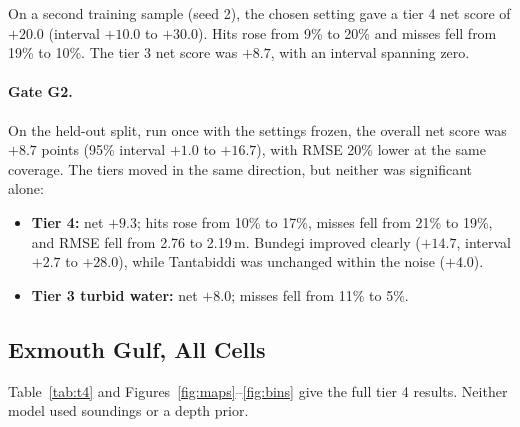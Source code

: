\documentclass[remotesensing,article,submit,pdftex]{Definitions/mdpi}
\begin{document}
On a second training sample (seed 2), the chosen setting gave a tier 4 net score of $+20.0$ (interval $+10.0$ to $+30.0$). Hits rose from 9\% to 20\% and misses fell from 19\% to 10\%. The tier 3 net score was $+8.7$, with an interval spanning zero.

\paragraph{Gate G2.} On the held-out split, run once with the settings frozen, the overall net score was $+8.7$ points (95\% interval $+1.0$ to $+16.7$), with RMSE 20\% lower at the same coverage. The tiers moved in the same direction, but neither was significant alone:
\begin{itemize}
\item \textbf{Tier 4:} net $+9.3$; hits rose from 10\% to 17\%, misses fell from 21\% to 19\%, and RMSE fell from 2.76 to 2.19\,m. Bundegi improved clearly ($+14.7$, interval $+2.7$ to $+28.0$), while Tantabiddi was unchanged within the noise ($+4.0$).
\item \textbf{Tier 3 turbid water:} net $+8.0$; misses fell from 11\% to 5\%.
\end{itemize}

\subsection{Exmouth Gulf, All Cells}\label{sec:t4}

Table~\ref{tab:t4} and Figures~\ref{fig:maps}--\ref{fig:bins} give the full tier 4 results. Neither model used soundings or a depth prior.
\end{document}
